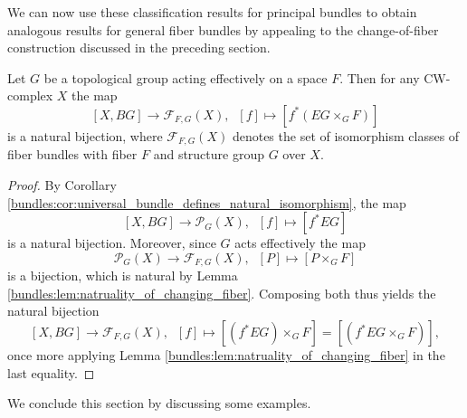 We can now use these classification results for principal bundles to obtain analogous results for general fiber bundles by appealing to the change-of-fiber construction discussed in the preceding section.

\begin{corollary}
    \label{bundles:cor:universal_fiber_bundles}
    Let $G$ be a topological group acting effectively on a space $F$. Then for any CW-complex $X$ the map 
    \[
    [X,BG] \to \mathcal{F}_{F,G}(X), \; \; [f] \mapsto \left[f^\ast(EG \times_G F)\right]
    \]
    is a natural bijection, where $\mathcal{F}_{F,G}(X)$ denotes the set of isomorphism classes of fiber bundles with fiber $F$ and structure group $G$ over $X$.
\end{corollary}

\begin{proof}
    By Corollary \ref{bundles:cor:universal_bundle_defines_natural_isomorphism}, the map 
    \[
    [X,BG] \to \mathcal{P}_G(X), \; \; [f] \mapsto [f^\ast EG]
    \]
    is a natural bijection. Moreover, since $G$ acts effectively the map 
    \[
    \mathcal{P}_G(X) \to \mathcal{F}_{F,G}(X), \; \; [P] \mapsto \left[P \times_G F\right]
    \]
    is a bijection, which is natural by Lemma \ref{bundles:lem:natruality_of_changing_fiber}. Composing both thus yields the natural bijection 
    \[
    [X,BG] \to \mathcal{F}_{F,G}(X), \; \; [f] \mapsto \left[(f^\ast EG) \times_G F\right] = \left[(f^\ast EG \times_G F)\right],
    \]
    once more applying Lemma \ref{bundles:lem:natruality_of_changing_fiber} in the last equality.
\end{proof}

\needspace{4cm}
We conclude this section by discussing some examples.

